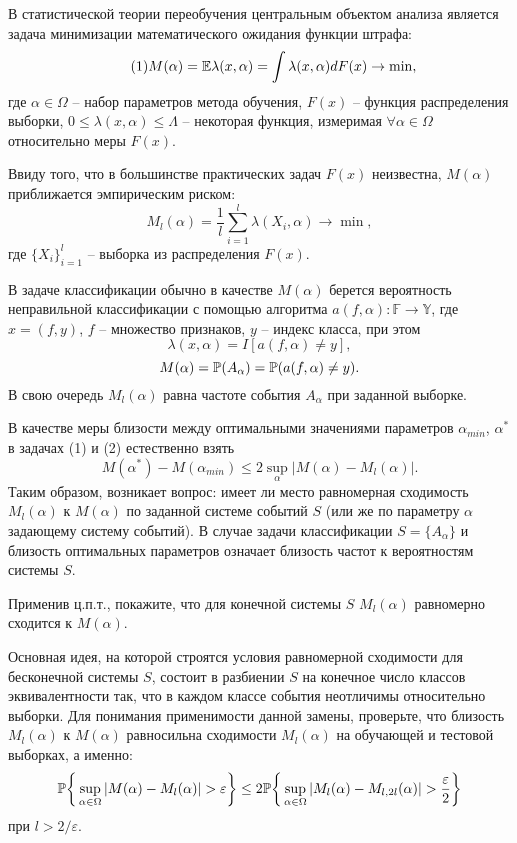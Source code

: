 \begin{problem}
В статистической теории переобучения центральным объектом анализа является задача минимизации математического ожидания функции штрафа:
\[\tag{1}
M(\alpha) = \mathrm{{\mathbb E}} \lambda(x, \alpha) = \int \lambda(x, \alpha) dF(x) \to \min,
\]
где $\alpha \in \Omega$ -- набор параметров метода обучения, $F(x)$ -- функция распределения выборки, 
$0\leq \lambda(x, \alpha) \leq \Lambda$ -- некоторая функция, измеримая $\forall \alpha \in \Omega$ относительно меры $F(x)$.  
  
Ввиду того, что в большинстве практических задач $F(x)$ неизвестна, $M(\alpha)$  приближается эмпирическим риском: 
\[\tag{2}
M_{l}(\alpha) = \frac{1}{l}\sum \limits_{i=1}^l \lambda(X_i, \alpha) \to \min,
\] 
где $\{X_i\}_{i=1}^{l}$ -- выборка из распределения 
$F(x)$.

В задаче классификации обычно в качестве $M(\alpha)$  берется вероятность неправильной классификации с помощью алгоритма $a(f, \alpha): \mathbb{F} \to \mathbb{Y}$, где $x = (f,y)$, $f$ -- множество признаков, $y$ -- индекс класса, при этом 
\[
\lambda(x, \alpha) = I[a(f, \alpha) \neq y],
\] 
\[
M(\alpha) = \mathrm{{\mathbb P}}(A_\alpha) = \mathrm{{\mathbb P}}(a(f, \alpha) \neq y).
\]
В свою очередь $M_{l}(\alpha)$ равна частоте события  $A_\alpha$ при заданной выборке.

В качестве меры близости между оптимальными значениями параметров $\alpha_{min}$, $\alpha^*$  в задачах (1) и (2) естественно взять 
\[
M(\alpha^*) - M(\alpha_{min}) \leq 2 \sup\limits_{\alpha} |M(\alpha) - M_l(\alpha)|.  
\]    
Таким образом, возникает вопрос: имеет ли место равномерная сходимость  $M_{l}(\alpha)$ к $M(\alpha)$ 
по заданной системе событий $S$ (или же по параметру $\alpha$  задающему систему событий). В случае задачи классификации $S = \{A_\alpha\}$ и близость оптимальных параметров означает близость частот к вероятностям системы $S$. 

Применив ц.п.т., покажите, что для конечной системы $S$  $M_{l}(\alpha)$ равномерно сходится к $M(\alpha)$.

Основная идея, на которой строятся условия равномерной сходимости для бесконечной системы $S$, состоит в разбиении $S$ на конечное число классов эквивалентности так, что в каждом классе события неотличимы относительно выборки. Для понимания применимости данной замены, проверьте, что близость $M_{l}(\alpha)$ к $M(\alpha)$
равносильна сходимости  $M_{l}(\alpha)$ на обучающей и тестовой выборках, а именно: 
\[
\mathrm{{\mathbb P}} \bigg\{\sup \limits_{\alpha \in \Omega} |M(\alpha) - M_l(\alpha)| > \varepsilon \bigg\} \leq 2 \mathrm{{\mathbb P}} \bigg\{\sup \limits_{\alpha \in \Omega} |M_l(\alpha) - M_{l,2l}(\alpha)| > \frac{\varepsilon}{2}  \bigg\} 
\] 
при $l > 2/ \varepsilon$.


\end{problem}
